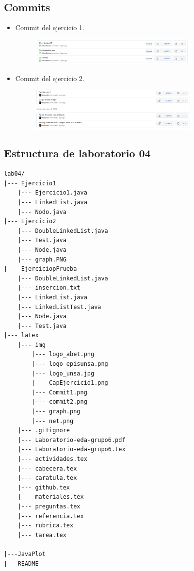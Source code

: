 \subsection{Commits}
\begin{itemize}
	\item Commit del ejercicio 1.
	\begin{figure}[H]
		\centering
\includegraphics[width=0.8\textwidth,keepaspectratio]{img/commit1.png}
	\end{figure}
	\item Commit del ejercicio 2.
	\begin{figure}[H]
		\centering
\includegraphics[width=0.8\textwidth,keepaspectratio]{img/commit2.png}
	\end{figure}
\end{itemize}

\subsection{Estructura de laboratorio 04}

\begin{lstlisting}[style=ascii-tree]
lab04/
|--- Ejercicio1
	|--- Ejercicio1.java
	|--- LinkedList.java
	|--- Nodo.java
|--- Ejercicio2
	|--- DoubleLinkedList.java
	|--- Test.java
	|--- Node.java
	|--- graph.PNG
|--- EjerciciopPrueba
	|--- DoubleLinkedList.java
	|--- insercion.txt
	|--- LinkedList.java
	|--- LinkedListTest.java
	|--- Node.java
	|--- Test.java
|--- latex
    |--- img
        |--- logo_abet.png
        |--- logo_episunsa.png
        |--- logo_unsa.jpg
        |--- CapEjercicio1.png
        |--- Commit1.png
        |--- commit2.png
        |--- graph.png
        |--- net.png
    |--- .gitignore
    |--- Laboratorio-eda-grupo6.pdf    
    |--- Laboratorio-eda-grupo6.tex
    |--- actividades.tex
    |--- cabecera.tex
    |--- caratula.tex
    |--- github.tex
    |--- materiales.tex
    |--- preguntas.tex
    |--- referencia.tex
    |--- rubrica.tex
    |--- tarea.tex
    
|---JavaPlot
|---README
\end{lstlisting}    

  